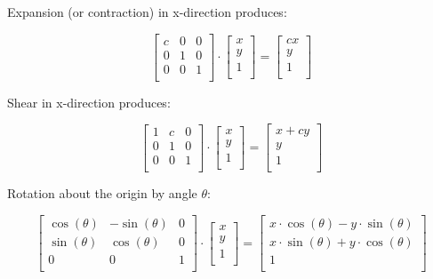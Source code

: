 \documentclass{article}
\begin{document}
Expansion (or contraction) in x-direction produces:

\[
  \begin{bmatrix}
    c & 0 & 0 \\
    0 & 1 & 0 \\
    0 & 0 & 1 \\
  \end{bmatrix}
  \cdot
  \begin{bmatrix}
    x \\
    y \\
    1 \\
  \end{bmatrix}
  = 
  \begin{bmatrix}
    cx \\
    y \\
    1 \\
  \end{bmatrix}
\]

Shear in x-direction produces:

\[
  \begin{bmatrix}
    1 & c & 0 \\
    0 & 1 & 0 \\
    0 & 0 & 1 \\
  \end{bmatrix}
  \cdot
  \begin{bmatrix}
    x \\
    y \\
    1 \\
  \end{bmatrix}
  = 
  \begin{bmatrix}
    x + cy \\
    y \\
    1 \\
  \end{bmatrix}
\]

Rotation about the origin by angle $\theta$:

\[
  \begin{bmatrix}
    \cos(\theta) & -\sin(\theta) & 0 \\
    \sin(\theta) & \cos(\theta) & 0 \\
    0 & 0 & 1 \\
  \end{bmatrix} \cdot
  \begin{bmatrix}
    x \\
    y \\
    1 \\
  \end{bmatrix}
  = 
  \begin{bmatrix}
    x \cdot \cos(\theta) - y \cdot \sin(\theta) \\
    x \cdot \sin(\theta) + y \cdot \cos(\theta) \\
    1 \\
  \end{bmatrix}
\]
\end{document}
